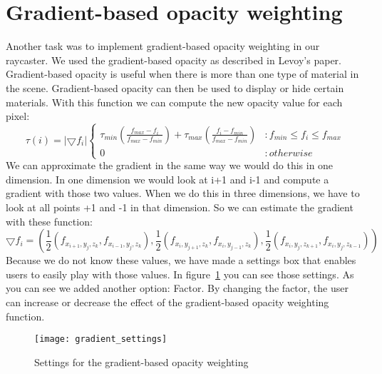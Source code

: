 \section{Gradient-based opacity weighting}\label{Sec:Gow}
Another task was to implement gradient-based opacity weighting in our raycaster.
We used the gradient-based opacity as described in Levoy’s paper.
Gradient-based opacity is useful when there is more than one type of  material in the scene. 
Gradient-based opacity can then be used to display or hide certain materials.
With this function we can compute the new opacity value for each pixel:
\[ \tau(i) = |\bigtriangledown f_{i}| \left\{
  \begin{array}{lr}
   \tau_{min} (\frac{ f_{max}- f_{i}}{ f_{max}- f_{min}}) +\tau_{max}( \frac{ f_{i}- f_{min}}{ f_{max}- f_{min}})  & : f_{min} \leq f_{i}  \leq f_{max} \\
    0 & : otherwise 
  \end{array}
\right.
\] 
We can approximate the gradient in the same way we would do this in one dimension. 
In one dimension we would look at i+1 and i-1 and compute a gradient with those two values.
When we do this in three dimensions, we have to look at all points +1 and -1 in that dimension.
So we can estimate the gradient with these function:
$$\bigtriangledown f_{i} = ( 
\frac{ 1}{2}( f_{x_{i+1},y_{j},z_{k}},f_{x_{i-1},y_{j},z_{k}} ),
\frac{ 1}{2}( f_{x_{i},y_{j+1},z_{k}},f_{x_{i},y_{j-1},z_{k}} ),
\frac{ 1}{2}( f_{x_{i},y_{j},z_{k+1}},f_{x_{i},y_{j},z_{k-1}} )) $$
Because we do not know these values, we have made a settings box that enables users to easily play with those values.
In figure~\ref{fig:gradient_settings} you can see those settings. 
As you can see we added another option: Factor. 
By changing the factor, the user can increase or decrease the effect of the gradient-based opacity weighting function.
\begin{figure}[H]
	\centering
		\texttt{[image: gradient\_settings]}
		\caption{Settings for the gradient-based opacity weighting}
	\label{fig:gradient_settings}
\end{figure}
